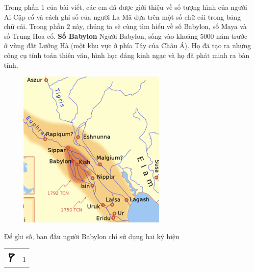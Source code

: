 \begin{multicols}{2}
	Trong phần $1$ của bài viết, các em đã được giới thiệu về số tượng hình của người Ai Cập cổ và cách ghi số của người La Mã dựa trên một số chữ cái trong bảng chữ cái. Trong phần $2$ này, chúng ta sẽ cùng tìm hiểu về số Babylon, số Maya và số Trung Hoa cổ.
	\vskip 0.1cm
	\textbf{\color{toancuabi}Số Babylon}
	\vskip 0.1cm
	Người Babylon, sống vào khoảng $5000$ năm trước ở vùng đất Lưỡng Hà (một khu vực ở phía Tây của  Châu Á). Họ đã tạo ra những công cụ tính toán thiên văn, hình học đáng kinh ngạc và họ đã phát minh ra bàn tính.
		\begin{figure}[H]
		\centering
		\vspace*{-5pt}
		\captionsetup{labelformat= empty, justification=centering}
		\includegraphics[width=1\linewidth]{17.1}
		\vspace*{-15pt}
	\end{figure}
	Để ghi số, ban đầu người Babylon chỉ sử dụng hai ký hiệu 
	\begin{table}[H]
		\vspace*{-5pt}
		\centering
		\begin{tabular}{|c|c|}
			\hline
			& \\[-2.5ex]
			\includegraphics[scale=0.7]{15}&$1$\\

\end{tabular}
\end{table}
\end{multicols}
